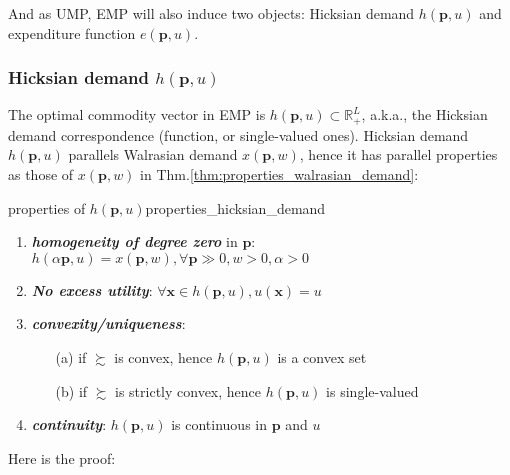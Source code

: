 And as UMP, EMP will also induce two objects: Hicksian demand $h(\mathbf{p},u)$ and expenditure function $e(\mathbf{p},u)$.

\subsubsection*{Hicksian demand $h(\mathbf{p},u)$}
The optimal commodity vector in EMP is $h(\mathbf{p},u)\subset\mathbb{R}^L_+$, a.k.a., the Hicksian demand correspondence (function, or single-valued ones). Hicksian demand $h(\mathbf{p},u)$ parallels Walrasian demand $ x(\mathbf{p},w)$, hence it has parallel properties as those of $ x(\mathbf{p},w)$ in Thm.\ref{thm:properties_walrasian_demand}:
\begin{theorem}{properties of $h(\mathbf{p},u)$}{properties_hicksian_demand}
    \begin{enumerate}
        \item \textit{\textbf{homogeneity of degree zero}} in $\mathbf{p}$: $h(\alpha\mathbf{p},u)= x(\mathbf{p},w),\forall \mathbf{p}\gg 0,w>0,\alpha>0$
        \item \textit{\textbf{No excess utility}}: $\forall \mathbf{x}\in h(\mathbf{p},u), u(\mathbf{x})=u$
        \item \textit{\textbf{convexity/uniqueness}}:
        \begin{enumerate}
            \item[(a)] if $\succsim$ is convex, hence $ h(\mathbf{p},u)$ is a convex set
            \item[(b)] if $\succsim$ is strictly convex, hence $ h(\mathbf{p},u)$ is single-valued    
        \end{enumerate}
        \item \textit{\textbf{continuity}}: $h(\mathbf{p},u)$ is continuous in $\mathbf{p}$ and $u$
    \end{enumerate}
\end{theorem}
Here is the proof:
